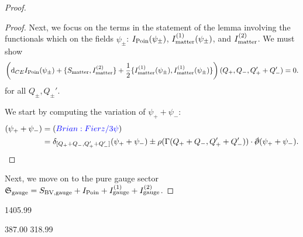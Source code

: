 \documentclass[10pt, oneside]{article}
\begin{document}
\begin{proof}
\begin{proof}
Next, we focus on the terms in the statement of the lemma involving the functionals which on the fields $\psi_{\pm}$: $I_{\rm Poin}(\psi_{\pm})$, $I^{(1)}_{\rm matter}(\psi_{\pm})$, and $I^{(2)}_{\rm matter}$. 
We must show
\[
\left({\rm d}_{CE} I_{\rm Poin}(\psi_\pm) + \{S_{\rm matter}, I_{\rm matter}^{(2)}\} + \frac{1}{2} \{I_{\rm matter}^{(1)}(\psi_\pm), I_{\rm matter}^{(1)}(\psi_\pm)\}\right) (Q_+, Q_-, Q_+' + Q_-') = 0.
\]
for all $Q_\pm, Q_\pm'$.

We start by computing the variation of $\psi_+ + \psi_-$:
\begin{align*}
[\delta_{Q_+ + Q_-}, \delta_{Q_+' + Q_-'}] (\psi_+ + \psi_-) & = \brian{Fierz / 3 \psi} \\ & = \delta_{[Q_+ + Q_-, Q_+' + Q_-']} (\psi_+ + \psi_-) \pm \rho(\Gamma(Q_++Q_-, Q_+' + Q_-')) \cdot \sd \dd (\psi_+ + \psi_-) .
\end{align*}
\end{proof} 

Next, we move on to the pure gauge sector $\mathfrak S_{\rm gauge} = S_{\rm BV, gauge} + I_{\rm Poin} + I^{(1)}_{\rm gauge} + I^{(2)}_{\rm gauge}$. 
\end{proof}
1405.99

387.00
318.99
\end{document}
